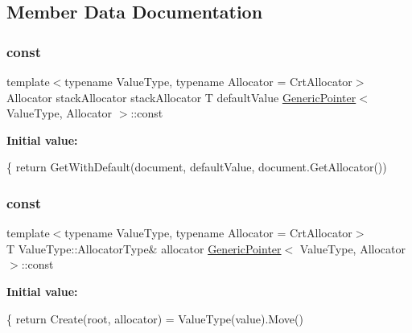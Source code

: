 \subsection{Member Data Documentation}
\mbox{\label{class_generic_pointer_ad6e06cd83cf52e045c7e07a67078e973}} 
\subsubsection{\texorpdfstring{const}{const}\hspace{0.1cm}{\footnotesize\ttfamily [1/3]}}
{\footnotesize\ttfamily template$<$typename Value\+Type, typename Allocator = Crt\+Allocator$>$ \\
Allocator stack\+Allocator stack\+Allocator T default\+Value \hyperlink{class_generic_pointer}{Generic\+Pointer}$<$ Value\+Type, Allocator $>$\+::const}

{\bfseries Initial value\+:}
\begin{DoxyCode}
\{
        \textcolor{keywordflow}{return} GetWithDefault(document, defaultValue, document.GetAllocator())
\end{DoxyCode}
\mbox{\label{class_generic_pointer_ace82428d4ad958b05a52480d949b32fa}} 
\subsubsection{\texorpdfstring{const}{const}\hspace{0.1cm}{\footnotesize\ttfamily [2/3]}}
{\footnotesize\ttfamily template$<$typename Value\+Type, typename Allocator = Crt\+Allocator$>$ \\
T Value\+Type\+::\+Allocator\+Type\& allocator \hyperlink{class_generic_pointer}{Generic\+Pointer}$<$ Value\+Type, Allocator $>$\+::const}

{\bfseries Initial value\+:}
\begin{DoxyCode}
\{
        \textcolor{keywordflow}{return} Create(root, allocator) = ValueType(value).Move()
\end{DoxyCode}
\mbox{\label{class_generic_pointer_abb1b141cfe93b7159842b5cad60d1be3}} 
